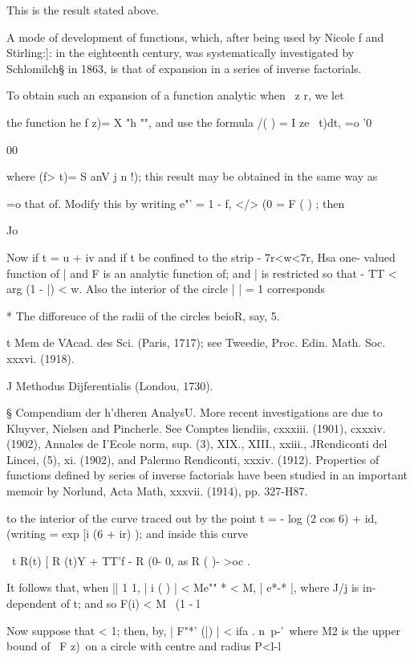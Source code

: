 {This is the result stated above.

A mode of development of functions, which, after being used by Nicole
f and Stirling:]: in the eighteenth century, was systematically
investigated by Schlomilch§ in 1863, is that of expansion in a series
of inverse factorials.

To obtain such an expansion of a function analytic when \ z r, we let

the function he f z)= X "h "", and use the formula /( ) = I ze~ t)dt,
=o '0

00

where (f> t)= S anV j n !); this result may be obtained in the same
way as

 =o that of. Modify this by writing e"' = 1 - f, </> (0 = F ( )
; then

Jo

Now if t = u + iv and if t be confined to the strip - 7r<w<7r, Hsa
one- valued function of | and F is an analytic function of; and | is
restricted so that - TT < arg (1 - |) < w. Also the interior of the
circle | | = 1 corresponds

* The difforeuce of the radii of the circles beioR, say, 5.

t Mem de VAcad. des Sci. (Paris, 1717); see Tweedie, Proc. Edin. Math.
Soc. xxxvi. (1918).

J Methodus Dijferentialis (Londou, 1730).

§ Compendium der h'dheren AnalysU. More recent investigations are due
to Kluyver, Nielsen and Pincherle. See Comptes liendiis, cxxxiii.
(1901), cxxxiv. (1902), Annales de I'Ecole norm, sup. (3), XIX.,
XIII., xxiii., JRendiconti del Lincei, (5), xi. (1902), and Palermo
Rendiconti, xxxiv. (1912). Properties of functions defined by series
of inverse factorials have been studied in an important memoir by
Norlund, Acta Math, xxxvii. (1914), pp. 327-H87.
%
%

to the interior of the curve traced out by the point t = - log (2 cos
6) + id, (writing = exp [i (6 + ir) ); and inside this curve

\ t R(t) [ R (t)Y + TT'f - R (0- 0, as R ( )- >oc .

It follows that, when || 1 1, | i ( ) | < Me"" * < M, | e*-* |, where
J/j is in- dependent of t; and so F(i) < M \ (1 - l

Now suppose that < 1; then, by, | F"*' (|) | < ifa . n\ p-'\
where M2 is the upper bound of \ F z)\ on a circle with centre and
radius P<l-l

}
